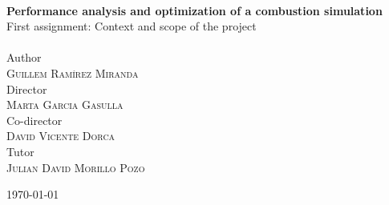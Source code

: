 \begin{titlepage}
\begin{center}
    \HRule\\[0.4cm]

    {
      \LARGE\bfseries Performance analysis and optimization of a combustion simulation\\[0.2cm]
    }
    {\large First assignment: Context and scope of the project}
    \\[0.4cm]\HRule\\[1cm]

    {\large Author}\\[0.1cm]
    \textsc{\large Guillem Ramírez Miranda}\\[0.4cm]
    {\large Director}\\[0.1cm]
    \textsc{\large Marta Garcia Gasulla}\\[0.4cm]
    {\large Co-director}\\[0.1cm]
    \textsc{\large David Vicente Dorca}\\[0.4cm]
    {\large Tutor}\\[0.1cm]
    \textsc{\large Julian David Morillo Pozo}\\[0.1cm]
    \vfill
    {\large \today\par}

  \end{center}

\end{titlepage}

